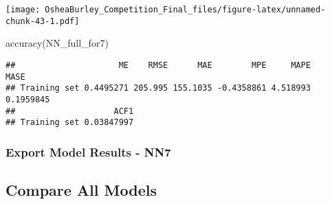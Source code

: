 \documentclass[
]{article}
\newenvironment{Shaded}{\begin{snugshade}}{\end{snugshade}}
\newcommand{\AttributeTok}[1]{\textcolor[rgb]{0.77,0.63,0.00}{#1}}
\newcommand{\CommentTok}[1]{\textcolor[rgb]{0.56,0.35,0.01}{\textit{#1}}}
\newcommand{\FunctionTok}[1]{\textcolor[rgb]{0.00,0.00,0.00}{#1}}
\newcommand{\NormalTok}[1]{#1}
\newcommand{\OtherTok}[1]{\textcolor[rgb]{0.56,0.35,0.01}{#1}}
\newcommand{\SpecialCharTok}[1]{\textcolor[rgb]{0.00,0.00,0.00}{#1}}
\begin{document}
\texttt{[image: OsheaBurley\_Competition\_Final\_files/figure-latex/unnamed-chunk-43-1.pdf]}

\begin{Shaded}
\begin{Highlighting}[]
\FunctionTok{accuracy}\NormalTok{(NN\_full\_for7)}
\end{Highlighting}
\end{Shaded}

\begin{verbatim}
##                     ME    RMSE      MAE        MPE     MAPE      MASE
## Training set 0.4495271 205.995 155.1035 -0.4358861 4.518993 0.1959845
##                    ACF1
## Training set 0.03847997
\end{verbatim}

\hypertarget{export-model-results---nn7}{%
\subsubsection{Export Model Results -
NN7}\label{export-model-results---nn7}}

\begin{Shaded}
\end{Shaded}

\hypertarget{compare-all-models}{%
\subsection{Compare All Models}\label{compare-all-models}}
\end{document}
